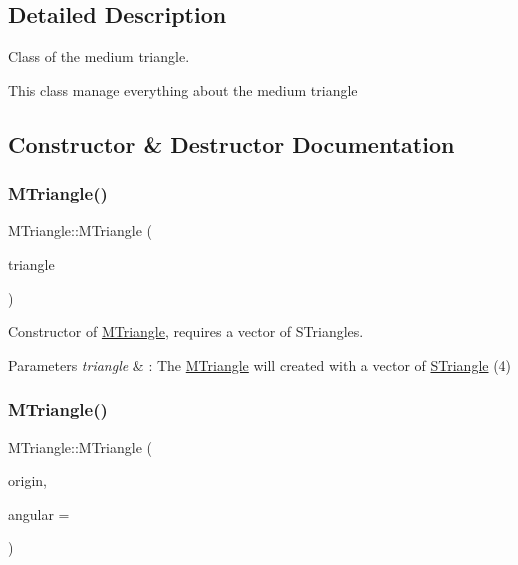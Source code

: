 \subsection{Detailed Description}
Class of the medium triangle. 

This class manage everything about the medium triangle 

\subsection{Constructor \& Destructor Documentation}
\mbox{\label{classMTriangle_a428bc13e1f5299369e5c78602aae544b}} 
\subsubsection{\texorpdfstring{M\+Triangle()}{MTriangle()}\hspace{0.1cm}{\footnotesize\ttfamily [1/2]}}
{\footnotesize\ttfamily M\+Triangle\+::\+M\+Triangle (\begin{DoxyParamCaption}\item[{const std\+::vector$<$ \hyperlink{classSTriangle}{S\+Triangle} $>$ \&}]{triangle }\end{DoxyParamCaption})\hspace{0.3cm}{\ttfamily [explicit]}}



Constructor of \hyperlink{classMTriangle}{M\+Triangle}, requires a vector of S\+Triangles. 


\begin{DoxyParams}{Parameters}
{\em triangle} & \+: The \hyperlink{classMTriangle}{M\+Triangle} will created with a vector of \hyperlink{classSTriangle}{S\+Triangle} (4) \\
\hline
\end{DoxyParams}
\mbox{\label{classMTriangle_aaf64b05da66c9196dcddbd0e4791096f}} 
\subsubsection{\texorpdfstring{M\+Triangle()}{MTriangle()}\hspace{0.1cm}{\footnotesize\ttfamily [2/2]}}
{\footnotesize\ttfamily M\+Triangle\+::\+M\+Triangle (\begin{DoxyParamCaption}\item[{\hyperlink{classPoint}{Point}$<$ double $>$}]{origin,  }\item[{double}]{angular = {} }\end{DoxyParamCaption})\hspace{0.3cm}{\ttfamily [explicit]}}



